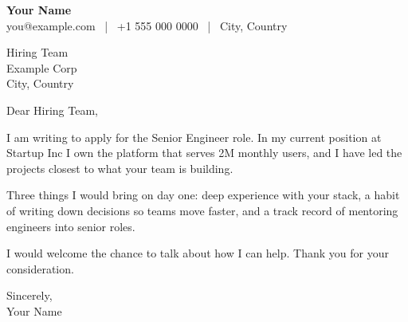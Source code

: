 \documentclass[11pt]{article}
\begin{document}
{\large\bfseries Your Name}\\
you@example.com \, | \, +1 555 000 0000 \, | \, City, Country

\vspace{1.5em}
Hiring Team\\
Example Corp\\
City, Country

\vspace{1.5em}
Dear Hiring Team,

I am writing to apply for the Senior Engineer role. In my current position at
Startup Inc I own the platform that serves 2M monthly users, and I have led
the projects closest to what your team is building.

Three things I would bring on day one: deep experience with your stack,
a habit of writing down decisions so teams move faster, and a track record
of mentoring engineers into senior roles.

I would welcome the chance to talk about how I can help. Thank you for your
consideration.

Sincerely,\\
Your Name
\end{document}
